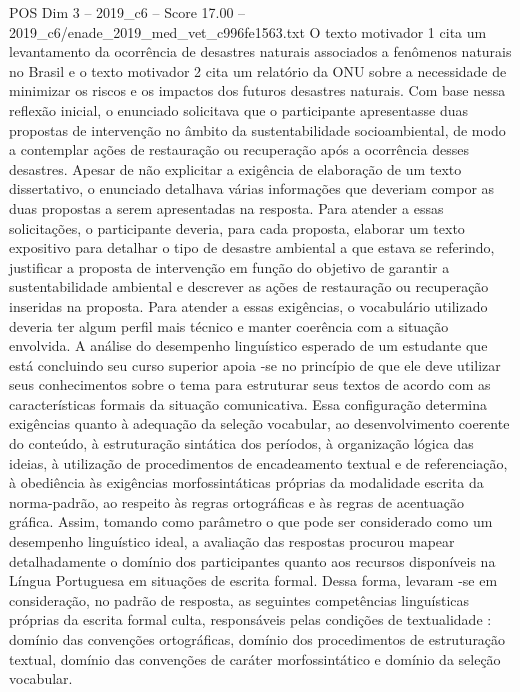 \begin{textsample}{POS Dim 3 – 2019\_c6 – Score 17.00 – 2019\_c6/enade\_2019\_med\_vet\_c996fe1563.txt}
O texto motivador 1 cita um levantamento da ocorrência de desastres naturais associados a fenômenos naturais no Brasil e o texto motivador 2 cita um relatório da ONU sobre a necessidade de minimizar os riscos e os impactos dos futuros desastres naturais.
Com base nessa reflexão inicial, o enunciado solicitava que o participante apresentasse duas propostas de intervenção no âmbito da sustentabilidade socioambiental, de modo a contemplar ações de restauração ou recuperação após a ocorrência desses desastres.
Apesar de não explicitar a exigência de elaboração de um texto dissertativo, o enunciado detalhava várias informações que deveriam compor as duas propostas a serem apresentadas na resposta.
Para atender a essas solicitações, o participante deveria, para cada proposta, elaborar um texto expositivo para detalhar o tipo de desastre ambiental a que estava se referindo, justificar a proposta de intervenção em função do objetivo de garantir a sustentabilidade ambiental e descrever as ações de restauração ou recuperação inseridas na proposta.
Para atender a essas exigências, o vocabulário utilizado deveria ter algum perfil mais técnico e manter coerência com a situação envolvida.
A análise do desempenho linguístico esperado de um estudante que está concluindo seu curso superior apoia -se no princípio de que ele deve utilizar seus conhecimentos sobre o tema para estruturar seus textos de acordo com as características formais da situação comunicativa.
Essa configuração determina exigências quanto à adequação da seleção vocabular, ao desenvolvimento coerente do conteúdo, à estruturação sintática dos períodos, à organização lógica das ideias, à utilização de procedimentos de encadeamento textual e de referenciação, à obediência às exigências morfossintáticas próprias da modalidade escrita da norma-padrão, ao respeito às regras ortográficas e às regras de acentuação gráfica.
Assim, tomando como parâmetro o que pode ser considerado como um desempenho linguístico ideal, a avaliação das respostas procurou mapear detalhadamente o domínio dos participantes quanto aos recursos disponíveis na Língua Portuguesa em situações de escrita formal.
Dessa forma, levaram -se em consideração, no padrão de resposta, as seguintes competências linguísticas próprias da escrita formal culta, responsáveis pelas condições de textualidade : domínio das convenções ortográficas, domínio dos procedimentos de estruturação textual, domínio das convenções de caráter morfossintático e domínio da seleção vocabular.

\end{textsample}
